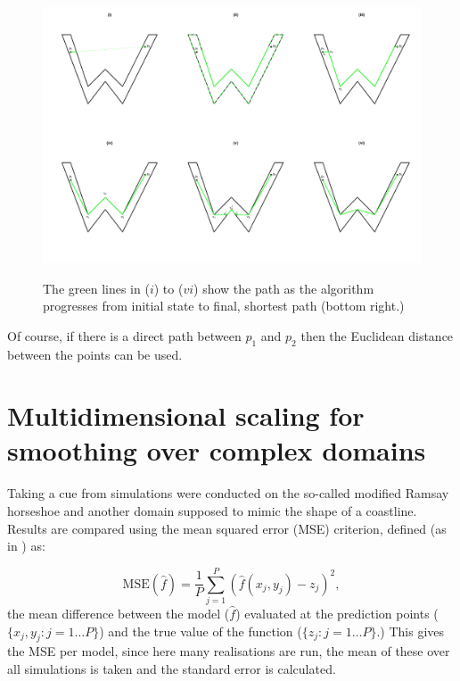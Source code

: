 \documentclass[a4paper,10pt]{article}
\begin{document}
\begin{figure}
\centering
\includegraphics[trim=0in 0.5in 0in 0.25in, width=9.5in]{figs/wdia.pdf} \\
\caption{The green lines in ($i$) to ($vi$) show the path as the algorithm progresses from initial state to final, shortest path (bottom right.) }
\label{wdia}
\end{figure}

Of course, if there is a direct path between $p_1$ and $p_2$ then the Euclidean distance between the points can be used.

\section{Multidimensional scaling for smoothing over complex domains}

Taking a cue from \cite{soap} simulations were conducted on the so-called modified Ramsay horseshoe and another domain supposed to mimic the shape of a coastline. Results are compared using the mean squared error (MSE) criterion, defined (as in \cite{elements}) as:

\begin{equation}
\text{MSE}(\hat{f}) = \frac{1}{P} \sum_{j=1}^P (\hat{f}(x_j, y_j) - z_j)^2,
\end{equation}
the mean difference between the model ($\hat{f}$) evaluated at the prediction points ($\{x_j, y_j : j=1 \dots P\}$) and the true value of the function ($\{z_j : j=1 \dots P\}$.) This gives the MSE per model, since here many realisations are run, the mean of these over all simulations is taken and the standard error is calculated.
\end{document}
